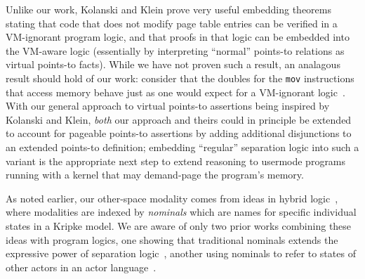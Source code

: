 Unlike our work, Kolanski and Klein prove very useful embedding theorems stating that code that does not modify page table 
entries can be verified in a VM-ignorant program logic, and that proofs in that logic can be embedded into the VM-aware logic 
(essentially by interpreting ``normal'' points-to relations as virtual points-to facts). While we have not proven such a result,
an analagous result {should} hold of our work: consider that the doubles for the \texttt{mov} instructions
that access memory behave just as one would expect for a VM-ignorant logic~\cite{Chlipala2013Bedrock}.
With our general approach to virtual points-to assertions being inspired by Kolanski and Klein, \emph{both}
 our approach and theirs could in principle be extended to account for pageable points-to assertions by adding additional 
disjunctions to an extended points-to definition; embedding ``regular'' separation logic into such a variant
is the appropriate next step to extend reasoning to usermode programs running with a kernel that may demand-page the program's
memory.

As noted earlier, our other-space modality comes from ideas in hybrid logic~\cite{areces2001hybrid,blackburn1995hybrid,gargov1993modal,goranko1996hierarchies},
where modalities are indexed by \emph{nominals} which are names for specific individual states in a Kripke model.
We are aware of only two prior works combining these ideas with program logics, one showing that traditional
nominals extends the expressive power of separation logic~\cite{brotherston2014parametric}, another
using nominals to refer to states of other actors in an actor language~\cite{gordon2019modal}.

